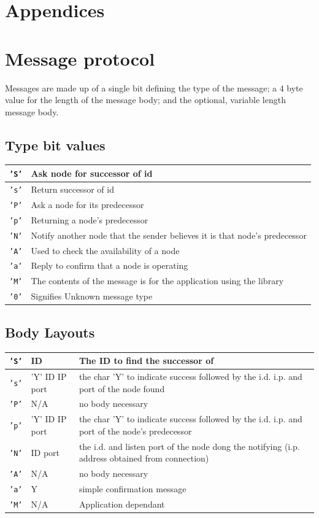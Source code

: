 \documentclass{article}
\begin{document}
%
%
\printbibliography


\section{Appendices}
\appendix
\section{Message protocol}

Messages are made up of a single bit defining the type of the message; a 4 byte value for the length of the message body; and the optional, variable length message body.

\subsection{Type bit values}
\begin{tabular}{|l | l|}
\hline
\texttt{'S'} & Ask node for successor of id \\\hline
\texttt{'s'} & Return successor of id \\\hline
\texttt{'P'} & Ask a node for its predecessor \\\hline
\texttt{'p'} & Returning a node's predecessor \\\hline
\texttt{'N'} & Notify another node that the sender believes it is that node's predecessor \\\hline
\texttt{'A'} & Used to check the availability of a node\\\hline
\texttt{'a'} & Reply to confirm that a node is operating \\\hline
\texttt{'M'} & The contents of the message is for the application using the library \\\hline
\texttt{'0'} & Signifies Unknown message type \\\hline
\end{tabular}

\subsection{Body Layouts}
\begin{tabular}{|l | l | L|}
\hline
\texttt{'S'} & ID & The ID to find the successor of\\\hline
\texttt{'s'} & 'Y' ID IP port & the char 'Y' to indicate success followed by the i.d. i.p. and port of the node found\\\hline
\texttt{'P'} & N/A & no body necessary\\\hline
\texttt{'p'} & 'Y' ID IP port & the char 'Y' to indicate success followed by the i.d. i.p. and port of the node's predecessor \\\hline
\texttt{'N'} & ID port & the i.d. and listen port of the node dong the notifying (i.p. address obtained from connection) \\\hline
\texttt{'A'} & N/A & no body necessary\\\hline
\texttt{'a'} & Y & simple confirmation message\\\hline
\texttt{'M'} & N/A & Application dependant\\\hline
\end{tabular}
\end{document}

